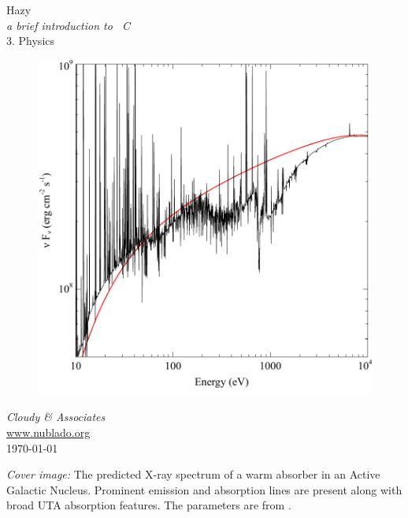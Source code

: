 \documentclass[12pt]{book}
\begin{document}
\frontmatter

\begin{titlepage}
\begin{center}

\Huge
Hazy\\
\Large
\emph{a brief introduction to \Cloudy\ C\VERSION}\\
\LARGE
3. Physics

\begin{figure}
\begin{center}
\includegraphics[clip=on,keepaspectratio]{WarmAbsorberReynoldsFabian}
\end{center}
\end{figure}

\vspace{15 mm }
\LARGE
\emph{Cloudy \& Associates} \\
\Large
\href{http://www.nublado.org}{www.nublado.org} \\
\normalsize
\today
\end{center}
\end{titlepage}

\clearpage

\vspace{5mm}
\noindent
{\small {\em Cover image:} The predicted X-ray spectrum of a warm absorber in
  an Active Galactic Nucleus. Prominent emission and absorption lines are
  present along with broad UTA absorption features. The parameters are from
  \citet{Reynolds1995}.
}
\clearpage
\end{document}
